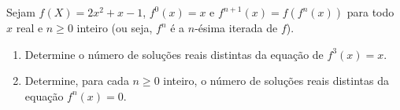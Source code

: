 Sejam $f(X) = 2x^2 + x - 1$,  $f^0(x) = x$ e  $f^{n+1}(x) = f(f^n(x))$ para todo  $x$ real e $n \ge 0$ inteiro (ou seja, $f^n$ é a $n$-ésima iterada de $f$).
\begin{enumerate}[label = (\alph*)]
	\item Determine o número de soluções reais distintas da equação de $f^3(x) = x$.
	\item Determine, para cada $n \ge 0$ inteiro, o número de soluções reais distintas da equação $f^n(x) = 0$.
\end{enumerate}
